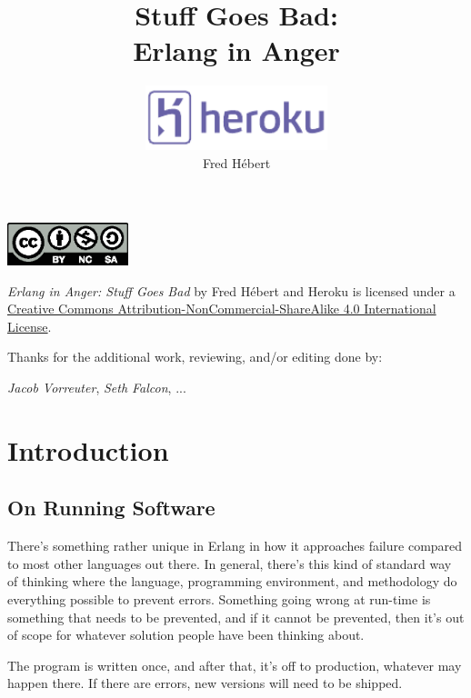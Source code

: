 \documentclass[11pt, oneside]{book}   	%
\title{Stuff Goes Bad:\protect\\ Erlang in Anger}
\author{\includegraphics[width=150pt]{heroku-logo-light.pdf}\\
Fred Hébert}
\date{}							%
\begin{document}
\maketitle

\clearpage
\thispagestyle{empty}
\vspace*{\fill}



\begin{center}
\includegraphics[width=100pt]{by-nc-sa.eps}
\end{center}

\begin{center}
\emph{Erlang in Anger: Stuff Goes Bad} by Fred Hébert and Heroku is licensed under a \href{http://creativecommons.org/licenses/by-nc-sa/4.0/}{Creative Commons Attribution-NonCommercial-ShareAlike 4.0 International License}.
\end{center}

Thanks for the additional work, reviewing, and/or editing done by:

\emph{Jacob Vorreuter}, \emph{Seth Falcon}, ...

\vspace*{\fill}
\clearpage


\tableofcontents

\listoffigures

\chapter{Introduction}
\label{chap:introduction}

\section{On Running Software}
\label{sec:on-running-software}

There's something rather unique in Erlang in how it approaches failure compared to most other languages out there. In general, there's this kind of standard way of thinking where the language, programming environment, and methodology do everything possible to prevent errors. Something going wrong at run-time is something that needs to be prevented, and if it cannot be prevented, then it's out of scope for whatever solution people have been thinking about.

The program is written once, and after that, it's off to production, whatever may happen there. If there are errors, new versions will need to be shipped.
\end{document}
